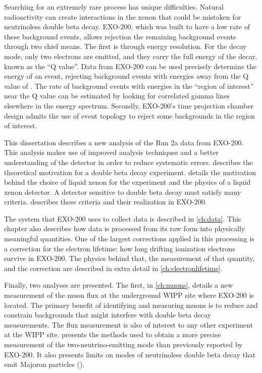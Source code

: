 \documentclass[herrin-thesis.tex]{subfiles}
\begin{document}
Searching for an extremely rare process has unique difficulties. Natural radioactivity can create interactions in the xenon that could be mistaken for neutrinoless double beta decay. EXO-200, which was built to have a low rate of these background events, allows rejection the remaining background events through two chief means. The first is through energy resolution. For the \zeronu{} decay mode, only two electrons are emitted, and they carry the full energy of the decay, known as the ``Q value''. Data from EXO-200 can be used precisely determine the energy of an event, rejecting background events with energies away from the Q value of . The rate of background events with energies in the ``region of interest'' near the Q value can be estimated by looking for correlated gamma lines elsewhere in the energy spectrum. Secondly, EXO-200's time projection chamber design admits the use of event topology to reject some backgrounds in the region of interest.

This dissertation describes a new analysis of the Run 2a data from EXO-200. This analysis makes use of improved analysis techniques and a better understanding of the detector in order to reduce systematic errors.  describes the theoretical motivation for a double beta decay experiment.  details the motivation behind the choice of liquid xenon for the experiment and the physics of a liquid xenon detector. A detector sensitive to double beta decay must satisfy many criteria.  describes these criteria and their realization in EXO-200.

The system that EXO-200 uses to collect data is described in \cref{ch:data}. This chapter also describes how data is processed from its raw form into physically meaningful quantities. One of the largest corrections applied in this processing is a correction for the electron lifetime: how long drifting ionization electrons survive in EXO-200. The physics behind that, the measurement of that quantity, and the correction are described in extra detail in \cref{ch:electronlifetime}.

Finally, two analyses are presented. The first, in \cref{ch:muons}, details a new measurement of the muon flux at the underground WIPP site where EXO-200 is located. The primary benefit of identifying and measuring muons is to reduce and constrain backgrounds that might interfere with double beta decay measurements. The flux measurement is also of interest to any other experiment at the WIPP site.  presents the methods used to obtain a more precise measurement of the two-neutrino-emitting mode than previously reported by EXO-200. It also presents limits on modes of neutrinoless double beta decay that emit Majoron particles (\zeronuXpX{}).
\end{document}
